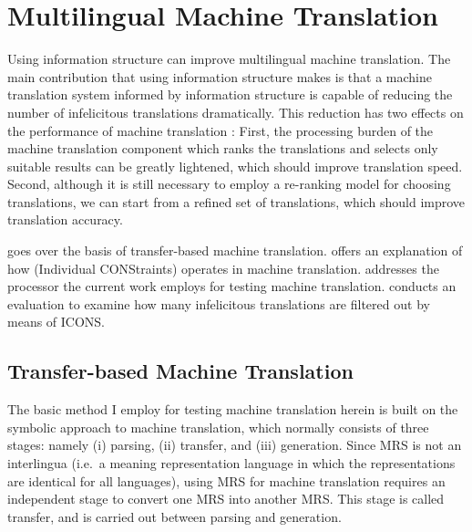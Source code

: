 \chapter{Multilingual Machine Translation}
\label{chapter12}
\setcounter{enums}{0}


\noindent Using information structure can improve multilingual machine
translation.  The main contribution that using information structure
makes is that a machine translation system informed by information
structure is capable of reducing the number of infelicitous
translations dramatically. This reduction has two effects on the
performance of  machine translation
\citep{song:bender:11}: First, the processing burden of the machine
translation component which ranks the translations and selects only
suitable results can be greatly lightened, which should improve
translation speed.  Second, although it is still necessary to employ a
re-ranking model for choosing translations, we can start from a
refined set of translations, which should improve translation
accuracy.


 goes over the basis of transfer-based machine
translation.   offers an explanation of how
 (Individual CONStraints)
operates in  machine
translation.  addresses the processor the
current work employs for testing machine
translation.  conducts an evaluation to examine
how many infelicitous translations are filtered out by means of ICONS.



\section{Transfer-based Machine Translation}
\label{2:sec:tmt}


The basic method I employ for testing machine translation herein is
built on the symbolic approach to machine translation, which normally
consists of three stages: namely (i)
parsing, (ii) transfer, and (iii) generation.  Since MRS is not an
interlingua (i.e.\ a meaning representation language in which
the representations are identical for all languages), using MRS for
machine translation requires an independent stage to convert one MRS
into another MRS. This stage is called transfer, and is carried out
between parsing and generation.  




